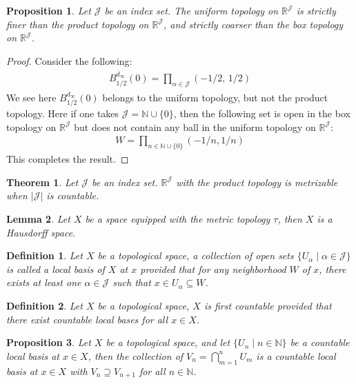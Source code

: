 \documentclass[11pt]{book}
\theoremstyle{break}
\theoremstyle{break}
\newtheorem{thm}{Theorem}[section]
\newtheorem{lem}{Lemma}[thm]
\newtheorem{prop}[lem]{Proposition}
\newtheorem{defn}{Definition}[corL]
\newcommand{\R}{\mathbb{R}}
\newcommand{\N}{\mathbb{N}}
\begin{document}
\begin{prop}
Let $\mathcal{J}$ be an index set. The uniform topology on $\R^\mathcal{J}$ is strictly finer than the product topology on $\R^\mathcal{J}$, and strictly coarser than the box topology on $\R^\mathcal{J}$.
\end{prop}
\begin{proof}
Consider the following:
\begin{align*}
B_{1/2}^{\overline{d}_\infty}(0) = \prod_{\alpha \in \mathcal{J}}(-1/2,\, 1/2)
\end{align*}
We see here $B_{1/2}^{\overline{d}_\infty}(0) $ belongs to the uniform topology, but not the product topology. Here if one takes $\mathcal{J} = \N \cup \{0\}$, then the following set is open in the box topology on $\R^{\mathcal{J}}$ but does not contain any ball in the uniform topology on $\R^{\mathcal{J}}$:
\begin{align*}
W = \prod_{n \in \N\cup \{0\}}(-1/n, 1/n)
\end{align*}
This completes the result. 
\end{proof}

\begin{thm}
Let $\mathcal{J}$ be an index set. $\R^{\mathcal{J}}$ with the product topology is metrizable when $|\mathcal{J}|$ is countable. 
\end{thm}


\begin{lem}
Let $X$ be a space equipped with the metric topology $\tau$, then $X$ is a Hausdorff space.
\end{lem}

\begin{defn}
Let $X$ be a topological space, a collection of open sets $\{U_\alpha \mid \alpha \in \mathcal{J}\}$ is called a local basis of $X$ at $x$ provided that for any neighborhood $W$ of $x$, there exists at least one $\alpha \in \mathcal{J}$ such that $x \in U_\alpha \subseteq W$.
\end{defn}

\begin{defn}
Let $X$ be a topological space, $X$ is first countable provided that there exist countable local bases for all $x \in X$. 
\end{defn}

\begin{prop}
Let $X$ be a topological space, and let $\{U_n\mid n \in \N\}$ be a countable local basis at $x \in X$, then the collection of $V_n = \bigcap_{m=1}^n U_m$ is a countable local basis at $x \in X$ with $V_n \supseteq V_{n+1}$ for all $n \in \N$. 
\end{prop}
\end{document}

